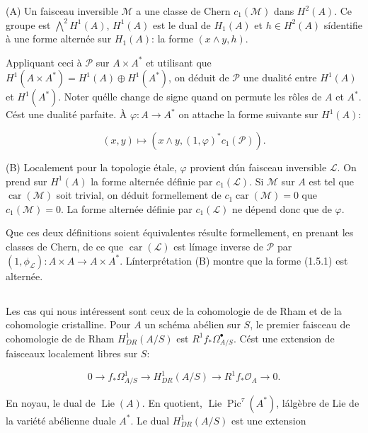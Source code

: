 \documentclass[11pt,a4paper]{article}
\theoremstyle{plain}
\theoremstyle{definition}
\DeclareMathOperator{\Lie}{Lie}
\DeclareMathOperator{\car}{car}
\DeclareMathOperator{\Pic}{Pic}
\begin{document}
(A) Un faisceau inversible $\mathscr{M}$ a une classe de Chern $c_1(\mathscr{M})$ dans $H^2(A)$. Ce
groupe est $\bigwedge^2 H^1(A)$, $H^1(A)$ est le dual de $H_1(A)$ et $h \in H^2(A)$ s\'identifie \`a une
forme altern\'ee sur $H_1(A)$: la forme $(x \wedge y, h)$.

Appliquant ceci \`a $\mathscr{P}$ sur $A \times A^*$ et utilisant que $H^1(A \times A^*) =
H^1(A) \oplus H^1(A^*)$, on d\'eduit de $\mathscr{P}$ une dualit\'e entre $H^1(A)$ et $H^1(A^*)$. Noter
qu\'elle change de signe quand on permute les r\^oles de $A$ et $A^*$. C\'est une dualit\'e
parfaite. \`A $\varphi: A \to A^*$ on attache la forme suivante sur $H^1(A)$:

\begin{equation}
(x, y) \longmapsto (x \wedge y, (1, \varphi)^* c_1(\mathscr{P})).
\end{equation}

(B) Localement pour la topologie \'etale, $\varphi$ provient d\'un faisceau inversible
$\mathscr{L}$. On prend sur $H^1(A)$ la forme altern\'ee d\'efinie par $c_1(\mathscr{L})$. Si $\mathscr{M}$ sur $A$ est tel
que $\car(\mathscr{M})$ soit trivial, on d\'eduit formellement de $c_1 \car(\mathscr{M}) = 0$ que $c_1(\mathscr{M}) = 0$.
La forme altern\'ee d\'efinie par $c_1(\mathscr{L})$ ne d\'epend donc que de $\varphi$.

Que ces deux d\'efinitions soient \'equivalentes r\'esulte formellement, en prenant
les classes de Chern, de ce que $\car(\mathscr{L})$ est l\'image inverse de $\mathscr{P}$ par
$(1, \phi_{\mathscr{L}}): A \times A \to A \times A^*$. L\'interpr\'etation (B) montre que la forme (1.5.1) est
altern\'ee.

\subsection{}

Les cas qui nous int\'eressent sont ceux de la cohomologie de de Rham et
de la cohomologie cristalline. Pour $A$ un sch\'ema ab\'elien sur $S$, le premier
faisceau de cohomologie de de Rham $H^1_{DR}(A/S)$ est $R^1f_* \Omega^\bullet_{A/S}$. C\'est une
extension de faisceaux localement libres sur $S$:

\begin{equation}
0 \longrightarrow f_* \Omega^1_{A/S} \longrightarrow H^1_{DR}(A/S) \longrightarrow R^1f_* \mathscr{O}_A \longrightarrow 0.
\end{equation}

En noyau, le dual de $\Lie(A)$. En quotient, $\Lie \Pic^\tau(A^*)$, l\'alg\`ebre de Lie de la
vari\'et\'e ab\'elienne duale $A^*$. Le dual $H_{DR}^1(A/S)$ est une extension
\end{document}
